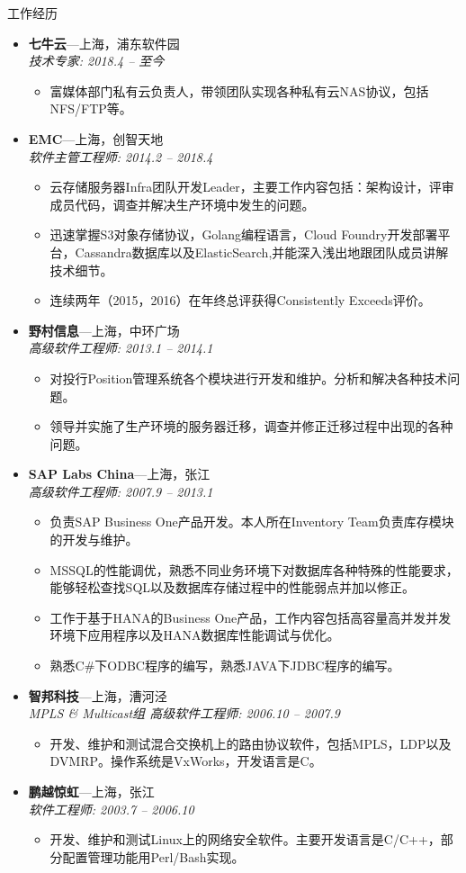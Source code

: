 \documentclass[11pt,oneside]{article}
\newenvironment{ressection}[1]{
	\vspace{4pt}
	{\selectfont\Large#1}
	\begin{itemize}
	\vspace{3pt}
}{
	\end{itemize}
}
\newcommand{\ressubitem}[1]{
	\vspace{-1pt}
	\item \begin{flushleft} #1 \end{flushleft}
}
\newcommand{\resbigitem}[3]{
	\vspace{-5pt}
	\item
	\textbf{#1}---#2 \\
	\textit{#3}
}
\newenvironment{ressubsec}[3]{
	\resbigitem{#1}{#2}{#3}
	\vspace{-2pt}
	\begin{itemize}
}{
    \end{itemize}
}
\begin{document}
\begin{ressection}{工作经历}

	\begin{ressubsec}{七牛云}{上海，浦东软件园}{技术专家: 2018.4 -- 至今}
		\ressubitem{富媒体部门私有云负责人，带领团队实现各种私有云NAS协议，包括NFS/FTP等。}
	\end{ressubsec}

	\begin{ressubsec}{EMC}{上海，创智天地}{软件主管工程师: 2014.2 -- 2018.4}
		\ressubitem{云存储服务器Infra团队开发Leader，主要工作内容包括：架构设计，评审成员代码，调查并解决生产环境中发生的问题。}
		\ressubitem{迅速掌握S3对象存储协议，Golang编程语言，Cloud Foundry开发部署平台，Cassandra数据库以及ElasticSearch,并能深入浅出地跟团队成员讲解技术细节。}
		\ressubitem{连续两年（2015，2016）在年终总评获得Consistently Exceeds评价。}
	\end{ressubsec}

	\begin{ressubsec}{野村信息}{上海，中环广场}{高级软件工程师: 2013.1 -- 2014.1}
		\ressubitem{对投行Position管理系统各个模块进行开发和维护。分析和解决各种技术问题。}
		\ressubitem{领导并实施了生产环境的服务器迁移，调查并修正迁移过程中出现的各种问题。}
	\end{ressubsec}

	\begin{ressubsec}{SAP Labs China}{上海，张江}{高级软件工程师: 2007.9 -- 2013.1}
		\ressubitem{负责SAP Business One产品开发。本人所在Inventory Team负责库存模块的开发与维护。}
		\ressubitem{MSSQL的性能调优，熟悉不同业务环境下对数据库各种特殊的性能要求，
					能够轻松查找SQL以及数据库存储过程中的性能弱点并加以修正。}
		\ressubitem{工作于基于HANA的Business One产品，工作内容包括高容量高并发并发环境下应用程序以及HANA数据库性能调试与优化。}
		\ressubitem{熟悉C\#下ODBC程序的编写，熟悉JAVA下JDBC程序的编写。}
	\end{ressubsec}

	\begin{ressubsec}{智邦科技}{上海，漕河泾}{MPLS \& Multicast组 高级软件工程师: 2006.10 -- 2007.9}
		\ressubitem{开发、维护和测试混合交换机上的路由协议软件，包括MPLS，LDP以及DVMRP。操作系统是VxWorks，开发语言是C。}
	\end{ressubsec}

	\begin{ressubsec}{鹏越惊虹}{上海，张江}{软件工程师: 2003.7 -- 2006.10}
		\ressubitem{开发、维护和测试Linux上的网络安全软件。主要开发语言是C/C++，部分配置管理功能用Perl/Bash实现。}
	\end{ressubsec}

\end{ressection}
\end{document}
